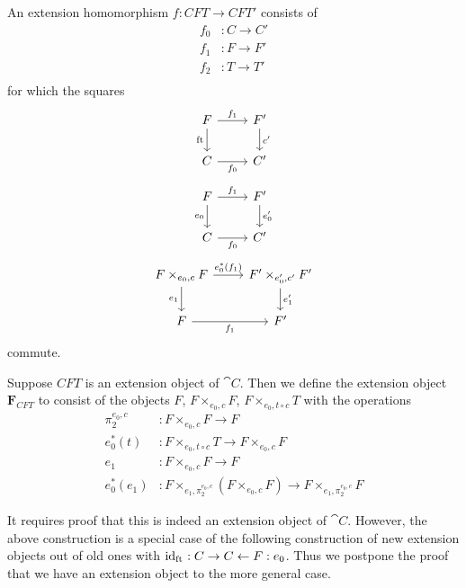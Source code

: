 \begin{defn}
An extension homomorphism $f:CFT\to CFT'$ consists of
\begin{align*}
f_0 & : C\to C'\\
f_1 & : F\to F'\\
f_2 & : T\to T'\\
\end{align*}
for which the squares
\begin{equation*}
\begin{tikzcd}
F \ar{d}[swap]{\eft} \ar{r}{f_1} & F' \ar{d}{c'}\\
C \ar{r}[swap]{f_0} & C'
\end{tikzcd}
\end{equation*}
\begin{equation*}
\begin{tikzcd}
F \ar{d}[swap]{e_0} \ar{r}{f_1} & F' \ar{d}{e_0'}\\
C \ar{r}[swap]{f_0} & C'
\end{tikzcd}
\end{equation*}
\begin{equation*}
\begin{tikzcd}
F\times_{e_0,c} F \ar{d}[swap]{e_1} \ar{r}{e_0^\ast(f_1)} & F'\times_{e_0',c'}F' \ar{d}{e_1'}\\
F \ar{r}[swap]{f_1} & F'
\end{tikzcd}
\end{equation*}
commute.
\end{defn}

\begin{defn}
Suppose $CFT$ is an extension object of $\cat{C}$. Then we define the extension object
$\mathbf{F}_{CFT}$ to consist of the objects $F$, $F\times_{e_0,c} F$, $F\times_{e_0,t\circ c} T$
with the operations
\begin{align*}
\pi_2^{e_0,c} & : F\times_{e_0,c} F\to F\\
e_0^\ast(t) & : F\times_{e_0,t\circ c} T\to F\times_{e_0,c} F\\
e_1 & : F\times_{e_0,c} F\to F\\
e_0^\ast(e_1) & : F\times_{e_1,\pi_2^{e_0,c}}(F\times_{e_0,c} F)\to F\times_{e_1,\pi_2^{e_0,c}} F
\end{align*}
\end{defn}

It requires proof that this is indeed an extension object of $\cat{C}$. However, the above
construction is a special case of the following construction of new extension objects out
of old ones with ${\mathrm{id}_{\mathrm{ft}_{}}}:C\rightarrow C\leftarrow F:e_0$. Thus we postpone the proof
that we have an extension object to the more general case. 

